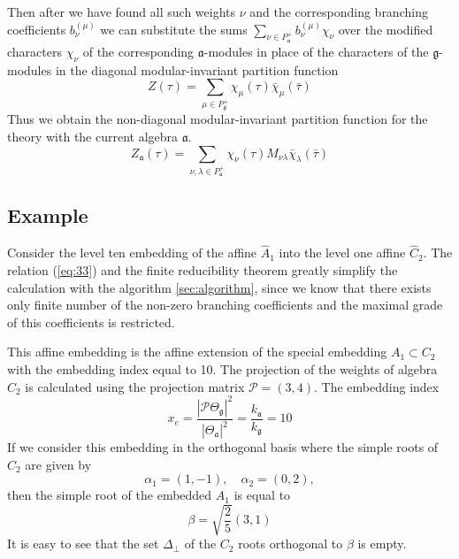 \documentclass[a4paper,12pt]{article}
\theoremstyle{definition} \newtheorem{Def}{Definition}
\begin{document}
Then after we have found all such weights $\nu$ and the corresponding branching coefficients $b^{(\mu)}_{\nu}$ we can substitute the sums $\sum_{\nu \in P^{+}_{\mathfrak{a}}}b^{(\mu)}_{\nu} \chi_{\nu}$ over the modified characters $\chi_{\nu}$ of the corresponding $\mathfrak{a}$-modules in place of the characters of the $\mathfrak{g}$-modules in the diagonal modular-invariant partition function
\begin{equation}
  \label{eq:34}
   Z(\tau)=\sum_{ \mu\in P^{+}_{\mathfrak{g}}} \chi_{\mu}(\tau)\bar \chi_{\mu}(\bar \tau)
\end{equation}
Thus we obtain the non-diagonal modular-invariant  partition function for the theory with the current algebra $\mathfrak{a}$.
\begin{equation}
  \label{eq:36}
   Z_{\mathfrak{a}}(\tau)=\sum_{ \nu,\lambda\in P^{+}_{\mathfrak{a}}} \chi_{\nu}(\tau)M_{\nu\lambda}\bar \chi_{\lambda}(\bar \tau)
\end{equation}


\subsection{Example}
\label{sec:example}

Consider the level ten embedding of the affine $\hat A_1$ into the level one affine $\hat C_2$. 
The relation (\ref{eq:33}) and the finite reducibility theorem greatly simplify the calculation with the algorithm \ref{sec:algorithm}, since we know that there exists only finite number of the non-zero branching coefficients and the maximal grade of this coefficients is restricted.

This affine embedding is the affine extension of the special embedding $A_1\subset C_2$ with the embedding index equal to 10. The projection of the weights of algebra $C_2$ is calculated using the projection matrix $\mathcal{P}=(3,4)$. The embedding index
\begin{equation}
  \label{eq:37}
  x_e=\frac{\left|\mathcal{P}\Theta_{\mathfrak{g}}\right|^2}{\left|\Theta_{\mathfrak{a}}\right|^2}=\frac{k_{\mathfrak{a}}}{k_{\mathfrak{g}}}=10
\end{equation}
If we consider this embedding in the orthogonal basis where the simple roots of $C_2$ are given by
\begin{equation}
  \label{eq:38}
  \alpha_1=(1,-1),\quad \alpha_2=(0,2),
\end{equation}
then the simple root of the embedded $A_1$ is equal to
\begin{equation}
  \label{eq:39}
  \beta=\sqrt{\frac{2}{5}}(3,1)
\end{equation}
It is easy to see that the set $\Delta_{\bot}$ of the $C_2$ roots orthogonal to $\beta$ is empty.
\end{document}
